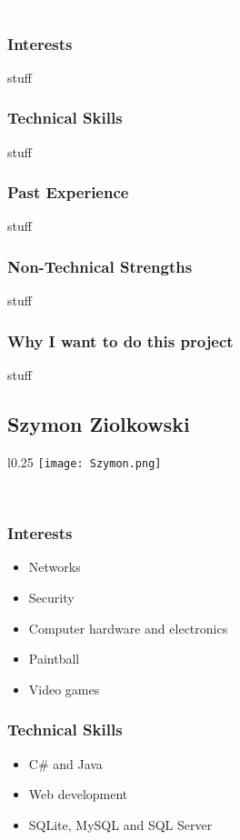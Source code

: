 \textcolor{white}{.}
\subsubsection{Interests} stuff
\subsubsection{Technical Skills} stuff
\subsubsection{Past Experience} stuff
\subsubsection{Non-Technical Strengths} stuff
\subsubsection{Why I want to do this project} stuff


\subsection{Szymon Ziolkowski}
\begin{wrapfigure}[5]{l}{0.25\textwidth}
\vspace{10pt}
\texttt{[image: Szymon.png]}
\end{wrapfigure}

\textcolor{white}{.}
\subsubsection{Interests}
	\begin{itemize}
		\item Networks
		\item Security
		\item Computer hardware and electronics
		\item Paintball
		\item Video games
	\end{itemize}
\subsubsection{Technical Skills} 
	\begin{itemize}
		\item C\# and Java
		\item Web development
		\item SQLite, MySQL and SQL Server
	\end{itemize}
